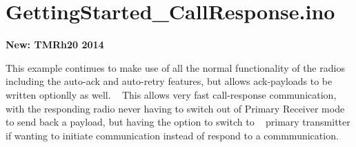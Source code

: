 \hypertarget{_getting_started__call_response_8ino-example}{\section{Getting\+Started\+\_\+\+Call\+Response.\+ino}
}
{\bfseries New\+: T\+M\+Rh20 2014}~\newline


This example continues to make use of all the normal functionality of the radios including the auto-\/ack and auto-\/retry features, but allows ack-\/payloads to be written optionlly as well. ~\newline
 This allows very fast call-\/response communication, with the responding radio never having to switch out of Primary Receiver mode to send back a payload, but having the option to switch to ~\newline
 primary transmitter if wanting to initiate communication instead of respond to a commmunication.


\begin{DoxyCodeInclude}
\end{DoxyCodeInclude}
 